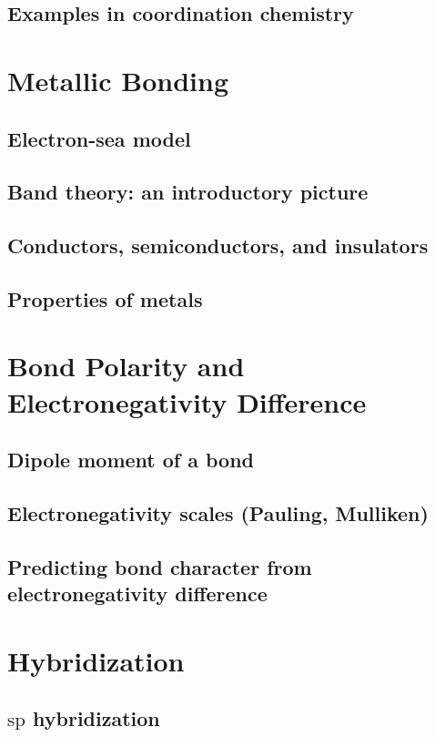 \documentclass[11pt]{article}
\begin{document}
	\subsection{Examples in coordination chemistry}

\section{Metallic Bonding}
	\subsection{Electron-sea model}
	\subsection{Band theory: an introductory picture}
	\subsection{Conductors, semiconductors, and insulators}
	\subsection{Properties of metals}

\section{Bond Polarity and Electronegativity Difference}
	\subsection{Dipole moment of a bond}
	\subsection{Electronegativity scales (Pauling, Mulliken)}
	\subsection{Predicting bond character from electronegativity difference}

\section{Hybridization}
	\subsection{\texorpdfstring{$\mathrm{sp}$ hybridization}{sp hybridization}}
\end{document}
